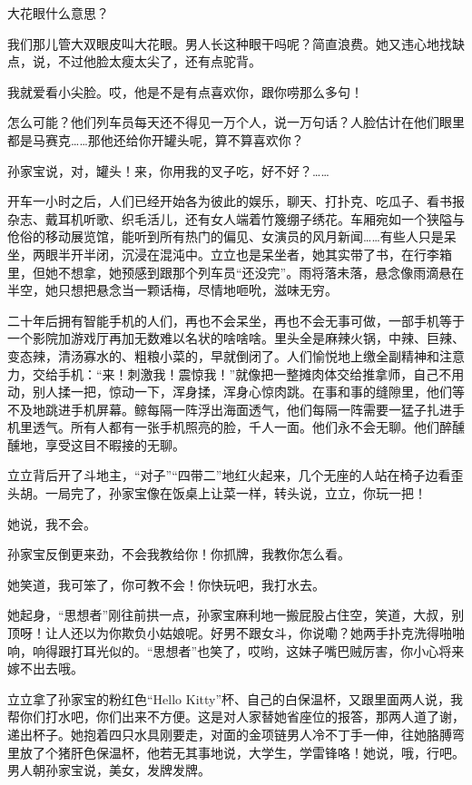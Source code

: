 \documentclass[lang=cn,newtx,12pt,scheme=chinese]{elegantbook}
\begin{document}
大花眼什么意思？

我们那儿管大双眼皮叫大花眼。男人长这种眼干吗呢？简直浪费。她又违心地找缺点，说，不过他脸太瘦太尖了，还有点驼背。

我就爱看小尖脸。哎，他是不是有点喜欢你，跟你唠那么多句！

怎么可能？他们列车员每天还不得见一万个人，说一万句话？人脸估计在他们眼里都是马赛克……那他还给你开罐头呢，算不算喜欢你？

孙家宝说，对，罐头！来，你用我的叉子吃，好不好？……

开车一小时之后，人们已经开始各为彼此的娱乐，聊天、打扑克、吃瓜子、看书报杂志、戴耳机听歌、织毛活儿，还有女人端着竹篾绷子绣花。车厢宛如一个狭隘与伧俗的移动展览馆，能听到所有热门的偏见、女演员的风月新闻……有些人只是呆坐，两眼半开半闭，沉浸在混沌中。立立也是呆坐者，她其实带了书，在行李箱里，但她不想拿，她预感到跟那个列车员“还没完”。雨将落未落，悬念像雨滴悬在半空，她只想把悬念当一颗话梅，尽情地咂吮，滋味无穷。

二十年后拥有智能手机的人们，再也不会呆坐，再也不会无事可做，一部手机等于一个影院加游戏厅再加无数难以名状的啥啥啥。里头全是麻辣火锅，中辣、巨辣、变态辣，清汤寡水的、粗粮小菜的，早就倒闭了。人们愉悦地上缴全副精神和注意力，交给手机：“来！刺激我！震惊我！”就像把一整摊肉体交给推拿师，自己不用动，别人揉一把，惊动一下，浑身揉，浑身心惊肉跳。在事和事的缝隙里，他们等不及地跳进手机屏幕。鲸每隔一阵浮出海面透气，他们每隔一阵需要一猛子扎进手机里透气。所有人都有一张手机照亮的脸，千人一面。他们永不会无聊。他们醉醺醺地，享受这目不暇接的无聊。

立立背后开了斗地主，“对子”“四带二”地红火起来，几个无座的人站在椅子边看歪头胡。一局完了，孙家宝像在饭桌上让菜一样，转头说，立立，你玩一把！

她说，我不会。

孙家宝反倒更来劲，不会我教给你！你抓牌，我教你怎么看。

她笑道，我可笨了，你可教不会！你快玩吧，我打水去。

她起身，“思想者”刚往前拱一点，孙家宝麻利地一搬屁股占住空，笑道，大叔，别顶呀！让人还以为你欺负小姑娘呢。好男不跟女斗，你说嘞？她两手扑克洗得啪啪响，响得跟打耳光似的。“思想者”也笑了，哎哟，这妹子嘴巴贼厉害，你小心将来嫁不出去哦。

立立拿了孙家宝的粉红色“Hello Kitty”杯、自己的白保温杯，又跟里面两人说，我帮你们打水吧，你们出来不方便。这是对人家替她省座位的报答，那两人道了谢，递出杯子。她抱着四只水具刚要走，对面的金项链男人冷不丁手一伸，往她胳膊弯里放了个猪肝色保温杯，他若无其事地说，大学生，学雷锋咯！她说，哦，行吧。男人朝孙家宝说，美女，发牌发牌。
\end{document}
